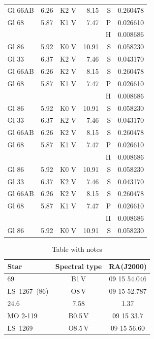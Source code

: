 \documentclass{aa}
\begin{document}
{\begin{landscape}
\begin{longtable}{lllrrr}
Gl 66AB  & 6.26 & K2 V & 8.15 & S & 0.260478\\
Gl 68    & 5.87 & K1 V & 7.47 & P & 0.026610\\
         &      &      &      & H & 0.008686\\
Gl 86    & 5.92 & K0 V & 10.91& S & 0.058230\\   Gl 33    & 6.37 & K2 V & 7.46 & S & 0.043170\\
Gl 66AB  & 6.26 & K2 V & 8.15 & S & 0.260478\\
Gl 68    & 5.87 & K1 V & 7.47 & P & 0.026610\\
         &      &      &      & H & 0.008686\\
Gl 86    & 5.92 & K0 V & 10.91& S & 0.058230\\   Gl 33    & 6.37 & K2 V & 7.46 & S & 0.043170\\
Gl 66AB  & 6.26 & K2 V & 8.15 & S & 0.260478\\
Gl 68    & 5.87 & K1 V & 7.47 & P & 0.026610\\
         &      &      &      & H & 0.008686\\
Gl 86    & 5.92 & K0 V & 10.91& S & 0.058230\\   Gl 33    & 6.37 & K2 V & 7.46 & S & 0.043170\\
Gl 66AB  & 6.26 & K2 V & 8.15 & S & 0.260478\\
Gl 68    & 5.87 & K1 V & 7.47 & P & 0.026610\\
         &      &      &      & H & 0.008686\\
Gl 86    & 5.92 & K0 V & 10.91& S & 0.058230\\   
\end{longtable}
\end{landscape}
}


\begin{table}[ht!]
\caption{\label{t7}Table with notes}
\centering
\begin{tabular}{lcc}
\hline\hline
Star&Spectral type&RA(J2000)\\
\hline
69           &B1\,V     &09 15 54.046\\
LS~1267~(86) &O8\,V     &09 15 52.787\\
24.6         &7.58      &1.37\\
\hline
MO 2-119     &B0.5\,V   &09 15 33.7\\
LS~1269      &O8.5\,V   &09 15 56.60\\
\hline
\end{tabular}
\end{table}
\end{document}
